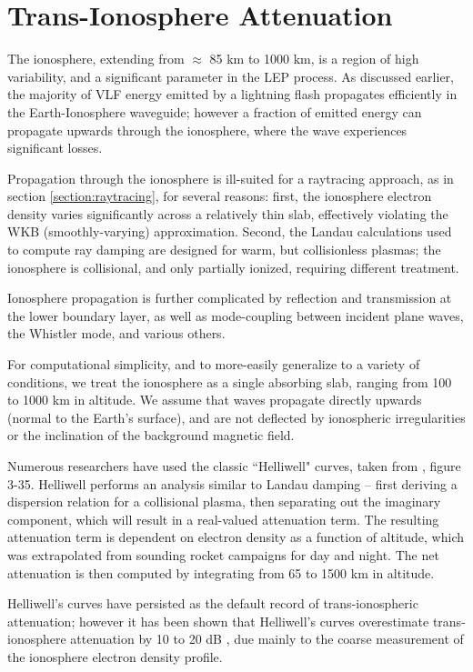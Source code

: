 \section{Trans-Ionosphere Attenuation}
\label{section:trans_ionosphere_atten}
The ionosphere, extending from $\approx$ 85 km to 1000 km, is a region of high variability, and a significant parameter in the LEP process. As discussed earlier, the majority of VLF energy emitted by a lightning flash propagates efficiently in the Earth-Ionosphere waveguide; however a fraction of emitted energy can propagate upwards through the ionosphere, where the wave experiences significant losses.

Propagation through the ionosphere is ill-suited for a raytracing approach, as in section \ref{section:raytracing}, for several reasons: first, the ionosphere electron density varies significantly across a relatively thin slab, effectively violating the WKB (smoothly-varying) approximation. Second, the Landau calculations used to compute ray damping are designed for warm, but collisionless plasmas; the ionosphere is collisional, and only partially ionized, requiring different treatment.

Ionosphere propagation is further complicated by reflection and transmission at the lower boundary layer, as well as mode-coupling between incident plane waves, the Whistler mode, and various others. 

For computational simplicity, and to more-easily generalize to a variety of conditions, we treat the ionosphere as a single absorbing slab, ranging from 100 to 1000 km in altitude. We assume that waves propagate directly upwards (normal to the Earth's surface), and are not deflected by ionospheric irregularities or the inclination of the background magnetic field.

Numerous researchers \citep{Lauben1998, Bortnik2005, Kulkarni2009, Graf2013} have used the classic ``Helliwell" curves, taken from \cite{Helliwell1965}, figure 3-35. Helliwell performs an analysis similar to Landau damping -- first deriving a dispersion relation for a collisional plasma, then separating out the imaginary component, which will result in a real-valued attenuation term. The resulting attenuation term is dependent on electron density as a function of altitude, which was extrapolated from sounding rocket campaigns for day and night. The net attenuation is then computed by integrating from 65 to 1500 km in altitude.

Helliwell's curves have persisted as the default record of trans-ionospheric attenuation; however it has been shown that Helliwell's curves overestimate trans-ionosphere attenuation by 10 to 20 dB \citep{Starks2008}, due mainly to the coarse measurement of the ionosphere electron density profile.

